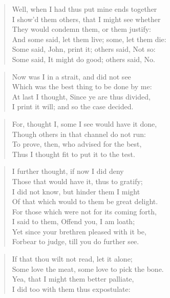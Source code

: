 \begin{verse}
Well, when I had thus put mine ends together\\
I show'd them others, that I might see whether\\
They would condemn them, or them justify:\\
And some said, let them live; some, let them die:\\
Some said, John, print it; others said, Not so:\\
Some said, It might do good; others said, No.\\

\end{verse}
\newpage
\begin{verse}
Now was I in a strait, and did not see\\
Which was the best thing to be done by me:\\
At last I thought, Since ye are thus divided,\\
I print it will; and so the case decided.\\
\end{verse}
\begin{verse}
For, thought I, some I see would have it done,\\
Though others in that channel do not run:\\
To prove, then, who advised for the best,\\
Thus I thought fit to put it to the test.\\
\end{verse}
\begin{verse}
I further thought, if now I did deny\\
Those that would have it, thus to gratify;\\
I did not know, but hinder them I might\\
Of that which would to them be great delight.\\
For those which were not for its coming forth,\\
I said to them, Offend you, I am loath;\\
Yet since your brethren pleased with it be,\\
Forbear to judge, till you do further see.\\
\end{verse}
\begin{verse}
If that thou wilt not read, let it alone;\\
Some love the meat, some love to pick the bone.\\
Yea, that I might them better palliate,\\
I did too with them thus expostulate:\\
\end{verse}
